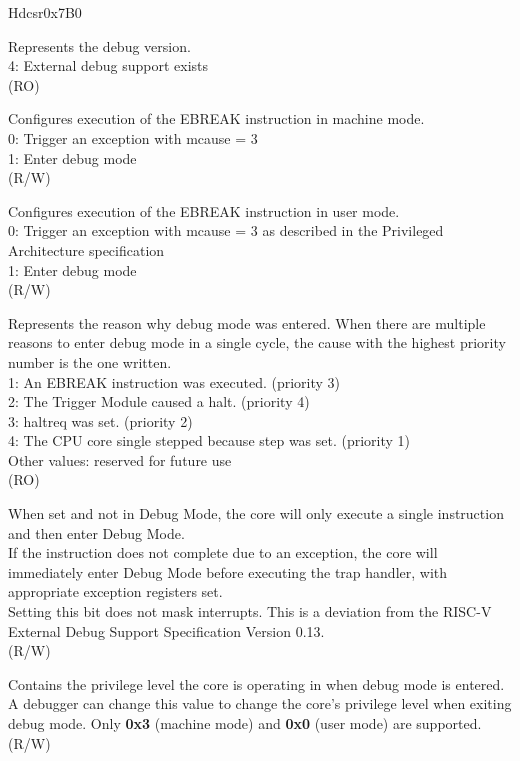 \begin{register}{H}{dcsr}{0x7B0}\label{regdesc:LPDCSR}
%
%
%
%
%
%
%
%
%
%
\regnewline%
\begin{regdesc}\begin{reglist}
\label{xdebugver}\item [xdebugver] Represents the debug version.\\
4: External debug support exists\\
(RO)
\label{ebreakm}\item [ebreakm] Configures execution of the EBREAK instruction in machine mode.\\
0: Trigger an exception with mcause = 3\\
1: Enter debug mode\\
(R/W)
\label{ebreaku}\item [ebreaku] Configures execution of the EBREAK instruction in user mode.\\
0: Trigger an exception with mcause = 3 as described in the Privileged Architecture specification\\
1: Enter debug mode\\
(R/W)
\label{cause}\item [cause] Represents the reason why debug mode was entered. When there are multiple reasons to enter debug mode in a single cycle, the cause with the highest priority number is the one written.\\
1: An EBREAK instruction was executed. (priority 3)\\
2: The Trigger Module caused a halt. (priority 4)\\
3: haltreq was set. (priority 2)\\
4: The CPU core single stepped because step was set. (priority 1)\\
Other values: reserved for future use\\
(RO)
\label{step}\item [step] When set and not in Debug Mode, the core will only execute a single instruction and then enter Debug Mode. \\
If the instruction does not complete due to an exception, the core will immediately enter Debug Mode before executing the trap handler, with appropriate exception registers set.\\
Setting this bit does not mask interrupts. This is a deviation from the RISC-V External Debug Support Specification Version 0.13.\\
(R/W)
\label{prv}\item [prv] Contains the privilege level the core is operating in when debug mode is entered. A debugger can change this value to change the core's privilege level when exiting debug mode. Only \textbf{0x3} (machine mode) and \textbf{0x0} (user mode) are supported. (R/W)
\end{reglist}\end{regdesc}
\end{register}

